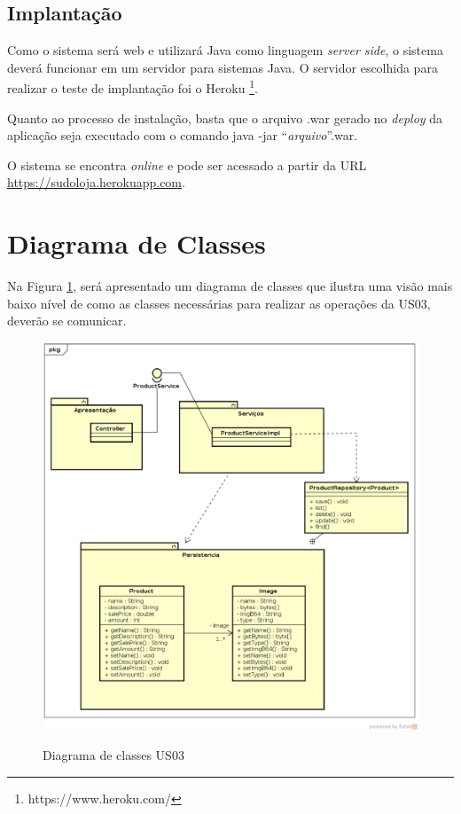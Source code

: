 \documentclass[a4paper,12pt]{monografia}
\begin{document}

\subsection{Implantação} %
\label{sub:o_que_deve_ser_produzido}

Como o sistema será web e utilizará Java como linguagem \textit{server side}, o sistema deverá funcionar em um servidor para sistemas  Java. O servidor escolhida para realizar o teste de implantação foi o Heroku \footnote{https://www.heroku.com/}.

Quanto ao processo de instalação, basta que o arquivo .war gerado no \textit{deploy} da aplicação seja executado com o comando java -jar ``\textit{arquivo}''.war.

O sistema se encontra \textit{online} e pode ser acessado a partir da URL \url{https://sudoloja.herokuapp.com}.



\section{Diagrama de Classes} %
\label{sec:diagrama_de_classes}

Na Figura \ref{fig:diagrama-classe-estoque}, será apresentado um diagrama de classes que ilustra uma visão mais baixo nível de como as classes necessárias para realizar as operações da US03, deverão se comunicar. 

\begin{figure}[H]
\centering
\caption{Diagrama de classes US03}
\centering
\includegraphics[width=15cm]{img/diagramas/class-diagram-estoque.eps}\\
\label{fig:diagrama-classe-estoque}
\end{figure}
\end{document}
